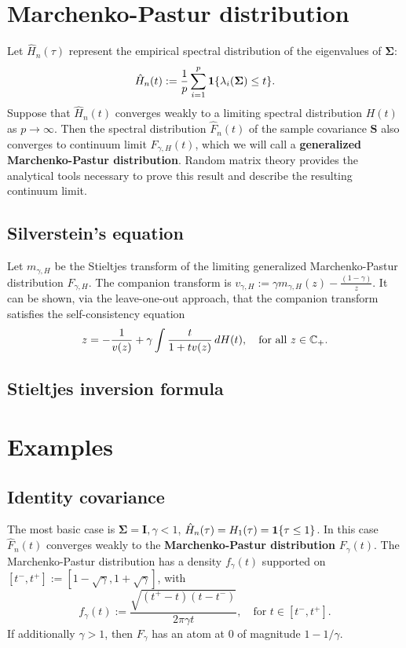\documentclass{article}
\newcommand{\bSigma}{\boldsymbol{\Sigma}}
\newcommand{\bS}{\boldsymbol{S}}
\newcommand{\bI}{\boldsymbol{I}}
\begin{document}
\section{Marchenko-Pastur distribution}
Let $\hat{H}_n(\tau)$ represent the empirical spectral distribution of the eigenvalues of $\bSigma$:
$$
\hat{H}_n(t) := \frac{1}{p} \sum_{i = 1}^{p} \1\{\lambda_i(\bSigma) \leq t\}.
$$
Suppose that $\hat{H}_n(t)$ converges weakly to a limiting spectral distribution $H(t)$ as $p \to \infty$. Then the spectral distribution $\hat{F}_n(t)$ of the sample covariance $\bS$ also converges to continuum limit $F_{\gamma,H}(t)$, which we will call a {\bf generalized Marchenko-Pastur distribution}. Random matrix theory provides the analytical tools necessary to prove this result and describe the resulting continuum limit.

\subsection{Silverstein's equation}
Let $m_{\gamma,H}$ be the Stieltjes transform of the limiting generalized Marchenko-Pastur distribution $F_{\gamma,H}$. The companion transform is $v_{\gamma,H} := \gamma m_{\gamma,H}(z) - \frac{(1 - \gamma)}{z}$. It can be shown, via the leave-one-out approach, that the companion transform satisfies the self-consistency equation
\begin{equation}
	\label{eqn:silverstein}
	z = -\frac{1}{v(z)} + \gamma \int \frac{t}{1 + tv(z)} \,dH(t), \quad \textrm{for all $z \in \mathbb{C}_{+}$.}
\end{equation}



\subsection{Stieltjes inversion formula}

\section{Examples}

\subsection{Identity covariance}

The most basic case is $\bSigma = \bI, \gamma < 1$, $\hat{H}_n(\tau) = H_1(\tau) = \mathbf{1}\{\tau \leq 1\}$. In this case $\hat{F}_n(t)$ converges weakly to the {\bf Marchenko-Pastur distribution} $F_{\gamma}(t)$. The Marchenko-Pastur distribution has a density $f_{\gamma}(t)$ supported on $[t^{-},t^{+}] := [1 - \sqrt{\gamma}, 1 + \sqrt{\gamma}]$, with 
$$
f_{\gamma}(t) := \frac{\sqrt{(t^{+} - t)(t - t^{-})}}{2 \pi \gamma t}, \quad \textrm{for $t \in [t^{-},t^{+}]$.}
$$
If additionally $\gamma > 1$, then $F_{\gamma}$ has an atom at $0$ of magnitude $1 - 1/\gamma$. 
\end{document}
